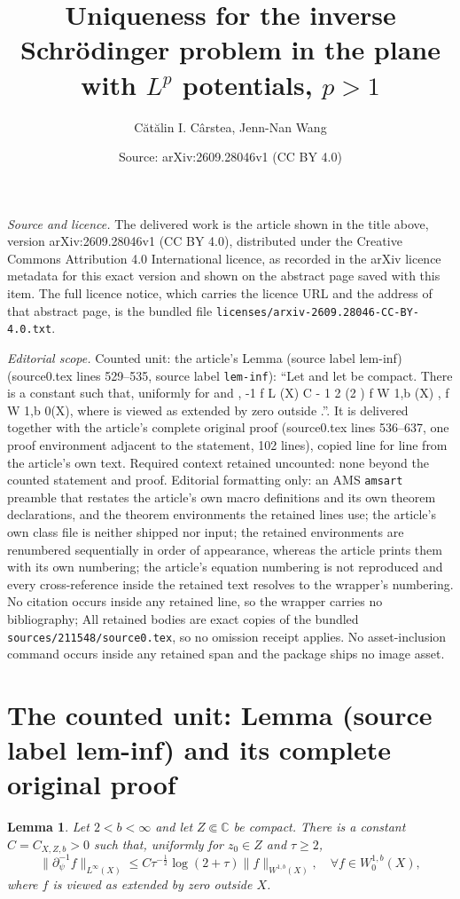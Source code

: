 \documentclass[10pt,a4paper]{amsart}
\title[Uniqueness for the inverse Schr\"odinger problem in the plane with $L^p$ potentials, $p>1$]{Uniqueness for the inverse Schr\"odinger problem in the plane with $L^p$ potentials, $p>1$}
\author{C\u{a}t\u{a}lin I. C\^arstea, Jenn-Nan Wang}
\date{Source: arXiv:2609.28046v1 (CC BY 4.0)}
\newcommand{\C}{\mathbb{C}}
\newcommand{\pr}{\partial}
\theoremstyle{plain}
\newtheorem{lem}[thm]{Lemma}
\theoremstyle{definition}
\theoremstyle{remark}
\begin{document}
\maketitle

\noindent\emph{Source and licence.} The delivered work is the article shown in the title above, version arXiv:2609.28046v1 (CC BY 4.0), distributed under the Creative Commons Attribution 4.0 International licence, as recorded in the arXiv licence metadata for this exact version and shown on the abstract page saved with this item. The full licence notice, which carries the licence URL and the address of that abstract page, is the bundled file \texttt{licenses/arxiv-2609.28046-CC-BY-4.0.txt}.
\par\smallskip

\noindent\textit{Editorial scope.} Counted unit: the article's Lemma (source label lem-inf) (source0.tex lines 529--535, source label \texttt{lem-inf}): ``Let and let be compact. There is a constant such that, uniformly for and , -1 f L (X) C - 1 2 (2 ) f W 1,b (X) , f W 1,b 0(X), where is viewed as extended by zero outside .''. It is delivered together with the article's complete original proof (source0.tex lines 536--637, one proof environment adjacent to the statement, 102 lines), copied line for line from the article's own text. Required context retained uncounted: none beyond the counted statement and proof. Editorial formatting only: an AMS \texttt{amsart} preamble that restates the article's own macro definitions and its own theorem declarations, and the theorem environments the retained lines use; the article's own class file is neither shipped nor input; the retained environments are renumbered sequentially in order of appearance, whereas the article prints them with its own numbering; the article's equation numbering is not reproduced and every cross-reference inside the retained text resolves to the wrapper's numbering. No citation occurs inside any retained line, so the wrapper carries no bibliography; All retained bodies are exact copies of the bundled \texttt{sources/211548/source0.tex}, so no omission receipt applies. No asset-inclusion command occurs inside any retained span and the package ships no image asset.


\section{The counted unit: Lemma (source label lem-inf) and its complete original proof}

\begin{lem}\label{lem-inf}
Let $2<b<\infty$ and let $Z\Subset\C$ be compact.  There is a constant $C=C_{X,Z,b}>0$ such that, uniformly for $z_0\in Z$ and $\tau\geq2$,
\begin{equation}
\|\pr_\psi^{-1}f\|_{L^\infty(X)}\leq  C\tau^{-\frac{1}{2}}\log(2+\tau) \|f\|_{W^{1,b}(X)},\quad \forall f\in W^{1,b}_0(X),
\end{equation}
where $f$ is viewed as extended by zero outside $X$.
\end{lem}
\end{document}

